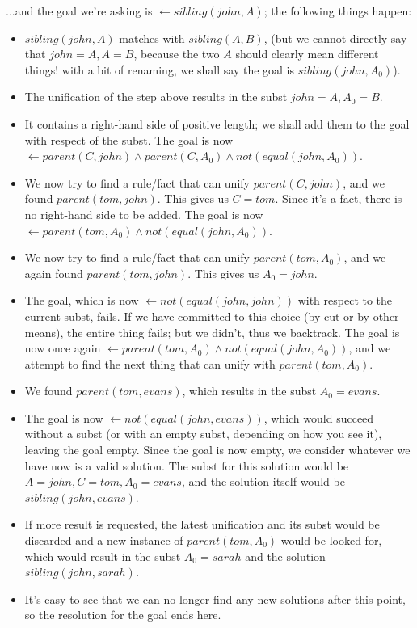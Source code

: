 ...and the goal we're asking is \(\leftarrow sibling(john, A)\); the following things happen:

\begin{itemize}
	\item \(sibling(john, A)\) matches with \(sibling(A,B)\), (but we cannot directly say that \(john = A, A = B\), because the two \(A\) should clearly mean different things! with a bit of renaming, we shall say the goal is \(sibling(john, A_0)\)).
	\item The unification of the step above results in the subst \(john = A, A_0 = B\).
	\item It contains a right-hand side of positive length; we shall add them to the goal with respect of the subst. The goal is now \(\leftarrow parent(C, john) \wedge parent(C, A_0) \wedge not(equal(john, A_0))\).
	\item We now try to find a rule/fact that can unify \(parent(C, john)\), and we found \(parent(tom,john)\). This gives us \(C=tom\). Since it's a fact, there is no right-hand side to be added. The goal is now \(\leftarrow parent(tom, A_0) \wedge not(equal(john, A_0))\).
	\item We now try to find a rule/fact that can unify \(parent(tom, A_0)\), and we again found \(parent(tom,john)\). This gives us \(A_0 = john\).
	\item The goal, which is now \(\leftarrow not(equal(john, john))\) with respect to the current subst, fails. If we have committed to this choice (by cut or by other means), the entire thing fails; but we didn't, thus we backtrack. The goal is now once again \(\leftarrow parent(tom, A_0) \wedge not(equal(john, A_0))\), and we attempt to find the next thing that can unify with \(parent(tom, A_0)\).
	\item We found \(parent(tom, evans)\), which results in the subst \(A_0 = evans\).
	\item The goal is now \(\leftarrow not(equal(john, evans))\), which would succeed without a subst (or with an empty subst, depending on how you see it), leaving the goal empty. Since the goal is now empty, we consider whatever we have now is a valid solution. The subst for this solution would be \(A=john, C=tom, A_0 = evans\), and the solution itself would be \(sibling(john, evans)\).
	\item If more result is requested, the latest unification and its subst would be discarded and a new instance of \(parent(tom, A_0)\) would be looked for, which would result in the subst \(A_0 = sarah\) and the solution \(sibling(john, sarah)\).
	\item It's easy to see that we can no longer find any new solutions after this point, so the resolution for the goal ends here.
\end{itemize}
